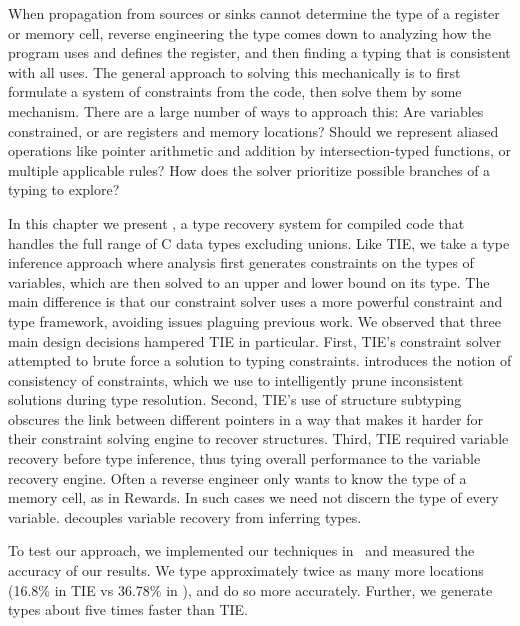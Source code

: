 When propagation from sources or sinks cannot determine the type of a register or memory cell, reverse engineering the type comes down to analyzing how the program uses and defines the register, and then finding a typing that is consistent with all uses. The general approach to solving this mechanically is to first formulate a system of constraints from the code, then solve them by some mechanism. There are a large number of ways to approach this: Are variables constrained, or are registers and memory locations? Should we represent aliased operations like pointer arithmetic and addition by intersection-typed functions, or multiple applicable rules? How does the solver prioritize possible branches of a typing to explore?


In this chapter we present \bitr, a type recovery system for compiled code that handles the full range of C data types excluding unions. Like TIE, we take a type inference approach where analysis first generates constraints on the types of variables, which are then solved to an upper and lower bound on its type. The main difference is that our constraint solver uses a more powerful constraint and type framework, avoiding issues plaguing previous work. We observed that three main design decisions hampered TIE in particular. First, TIE's constraint solver attempted to brute force a solution to typing constraints. \bitr{} introduces the notion of consistency of constraints, which we use to intelligently prune inconsistent solutions during type resolution.  Second, TIE's use of structure subtyping obscures the link between different pointers in a way that makes it harder for their constraint solving engine to recover structures. Third, TIE required variable recovery before type inference, thus tying overall performance to the variable recovery engine. Often a reverse engineer only wants to know the type of a memory cell, as in Rewards.  In such cases we need not discern the type of every variable. \bitr{} decouples variable recovery from inferring types.


  To test our approach, we implemented our techniques in \bitr\ and measured the accuracy of our results. We type approximately twice as many more locations (16.8\% in TIE vs 36.78\% in \bitr), and do so more accurately. Further, we generate types about five times faster than TIE.


